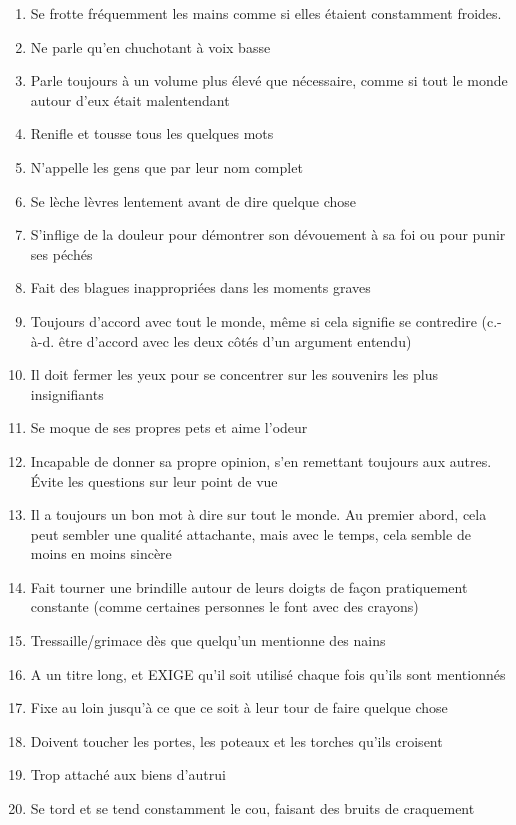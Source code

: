 \documentclass{article}
\begin{document}
\begin{multicols}{2}
	\begin{enumerate}
		\item Se frotte fréquemment les mains comme si elles étaient constamment froides.
		\item Ne parle qu'en chuchotant à voix basse
		\item Parle toujours à un volume plus élevé que nécessaire, comme si tout le monde autour d'eux était malentendant
		\item Renifle et tousse tous les quelques mots
		\item N'appelle les gens que par leur nom complet
		\item Se lèche lèvres lentement avant de dire quelque chose
		\item S'inflige de la douleur pour démontrer son dévouement à sa foi ou pour punir ses péchés
		\item Fait des blagues inappropriées dans les moments graves
		\item Toujours d'accord avec tout le monde, même si cela signifie se contredire (c.-à-d. être d'accord avec les deux côtés d'un argument entendu)
		\item Il doit fermer les yeux pour se concentrer sur les souvenirs les plus insignifiants
		\item Se moque de ses propres pets et aime l’odeur
		\item Incapable de donner sa propre opinion, s'en remettant toujours aux autres. Évite les questions sur leur point de vue
		\item Il a toujours un bon mot à dire sur tout le monde. Au premier abord, cela peut sembler une qualité attachante, mais avec le temps, cela semble de moins en moins sincère
		\item Fait tourner une brindille autour de leurs doigts de façon pratiquement constante (comme certaines personnes le font avec des crayons)
		\item Tressaille/grimace dès que quelqu'un mentionne des nains
		\item A un titre long, et EXIGE qu'il soit utilisé chaque fois qu'ils sont mentionnés
		\item Fixe au loin jusqu'à ce que ce soit à leur tour de faire quelque chose
		\item Doivent toucher les portes, les poteaux et les torches qu'ils croisent
		\item Trop attaché aux biens d'autrui
		\item Se tord et se tend constamment le cou, faisant des bruits de craquement

\end{enumerate}
\end{multicols}
\end{document}
